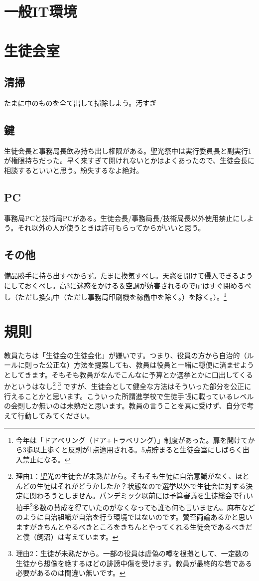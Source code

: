 \documentclass[dvipdfmx,jb5]{jarticle}
\begin{document}
\section{一般IT環境}
\section{生徒会室}
\subsection{清掃}
たまに中のものを全て出して掃除しよう。汚すぎ
\subsection{鍵}
生徒会長と事務局長飲み持ち出し権限がある。聖光祭中は実行委員長と副実行1が権限持ちだった。早く来すぎて開けれないとかはよくあったので、生徒会長に相談するといいと思う。紛失するなよ絶対。
\subsection{PC}
事務局PCと技術局PCがある。生徒会長/事務局長/技術局長以外使用禁止にしよう。それ以外の人が使うときは許可もらってからがいいと思う。
\subsection{その他}
備品勝手に持ち出すべからず。たまに換気すべし。天窓を開けて侵入できるようにしておくべし。高3に迷惑をかける＆空調が妨害されるので扉はすぐ閉めるべし（ただし換気中（ただし事務局印刷機を稼働中を除く。）を除く。）。\footnote{今年は「ドアベリング（ドア+トラベリング）」制度があった。扉を開けてから3歩以上歩くと反則が1点適用される。5点貯まると生徒会室にしばらく出入禁止になる。}
\section{規則}
教員たちは「生徒会の生徒会化」が嫌いです。つまり、役員の方から自治的（ルールに則った公正な）方法を提案しても、教員は役員と一緒に穏便に済ませようとしてきます。そもそも教員がなんでこんなに予算とか選挙とかに口出してくるかというはなし\footnote{理由1：聖光の生徒会が未熟だから。そもそも生徒に自治意識がなく、ほとんどの生徒はそれがどうかしたか？状態なので選挙以外で生徒会に対する決定に関わろうとしません。パンデミック以前には予算審議を生徒総会で行い拍手\footnote{起立にしろよ}多数の賛成を得ていたのがなくなっても誰も何も言いません。麻布などのように自治組織が自治を行う環境ではないのです。賛否両論あるかと思いますがきちんとやるべきところをきちんとやってくれる生徒会であるべきだと僕（飼沼）は考えています。} \footnote{理由2：生徒が未熟だから。一部の役員は虚偽の噂を根拠として、一定数の生徒から想像を絶するほどの誹謗中傷を受けます。教員が最終的な砦である必要があるのは間違い無いです。} ですが、生徒会として健全な方法はそういった部分を公正に行えることかと思います。こういった所謂進学校で生徒手帳に載っているレベルの会則しか無いのは未熟だと思います。教員の言うことを真に受けず、自分で考えて行動してみてください。
\end{document}
